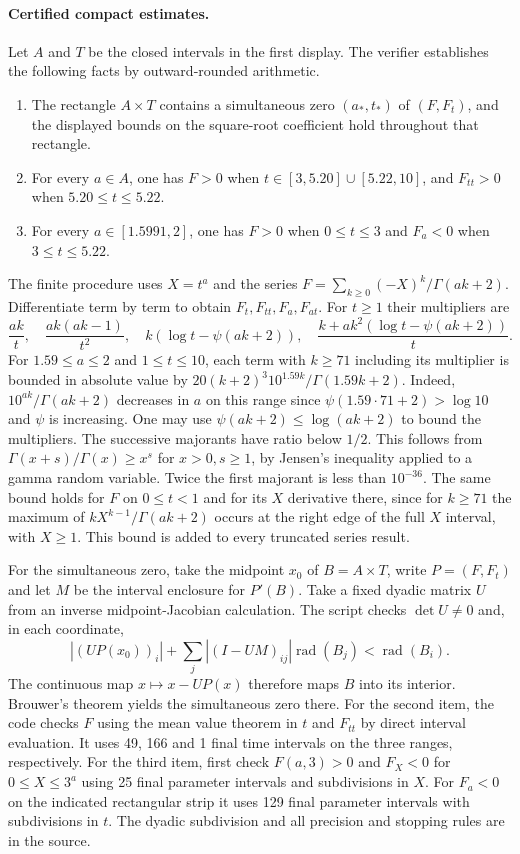 \documentclass[11pt,a4paper]{article}
\numberwithin{equation}{section}
\begin{document}
\paragraph{Certified compact estimates.}
Let $A$ and $T$ be the closed intervals in the first display. The
verifier establishes the following facts by outward-rounded arithmetic.
\begin{enumerate}
\item The rectangle $A\times T$ contains a simultaneous zero
$(a_*,t_*)$ of $(F,F_t)$, and the displayed bounds on the square-root
coefficient hold throughout that rectangle.
\item For every $a\in A$, one has $F>0$ when
$t\in[3,5.20]\cup[5.22,10]$, and $F_{tt}>0$ when $5.20\le t\le5.22$.
\item For every $a\in[1.5991,2]$, one has $F>0$ when $0\le t\le3$
and $F_a<0$ when $3\le t\le5.22$.
\end{enumerate}

The finite procedure uses $X=t^a$ and the series
$F=\sum_{k\ge0}(-X)^k/\Gamma(ak+2)$. Differentiate
term by term to obtain $F_t,F_{tt},F_a,F_{at}$. For $t\ge1$ their multipliers are
\[
 \frac{ak}{t},\quad \frac{ak(ak-1)}{t^2},\quad k(\log t-\psi(ak+2)),
 \quad \frac{k+ak^2(\log t-\psi(ak+2))}{t}.
\]
For $1.59\le a\le2$ and $1\le t\le10$, each term with $k\ge71$
including its multiplier is bounded in absolute value by
$20(k+2)^3 10^{1.59k}/\Gamma(1.59k+2)$. Indeed,
$10^{ak}/\Gamma(ak+2)$ decreases in $a$ on this range since
$\psi(1.59\cdot71+2)>\log10$ and $\psi$ is increasing.
One may use $\psi(ak+2)\le\log(ak+2)$ to bound the multipliers.
The successive majorants have ratio below $1/2$. This follows from
$\Gamma(x+s)/\Gamma(x)\ge x^s$ for $x>0,s\ge1$, by Jensen's inequality
applied to a gamma random variable. Twice the first majorant is
less than $10^{-36}$. The same bound holds for $F$ on $0\le t<1$
and for its $X$ derivative there, since for $k\ge71$ the maximum
of $k X^{k-1}/\Gamma(ak+2)$ occurs at the right edge of the full
$X$ interval, with $X\ge1$. This bound is added to every truncated
series result.

For the simultaneous zero, take the midpoint $x_0$ of $B=A\times T$,
write $P=(F,F_t)$ and let $M$ be the interval enclosure for $P'(B)$.
Take a fixed dyadic matrix $U$ from an inverse midpoint-Jacobian
calculation. The script checks $\det U\ne0$ and, in each coordinate,
\[
 |(UP(x_0))_i|+\sum_j|(I-UM)_{ij}|\operatorname{rad}(B_j)
                 <\operatorname{rad}(B_i).
\]
The continuous map $x\mapsto x-UP(x)$ therefore maps $B$ into its
interior. Brouwer's theorem yields the simultaneous zero there.
For the second item, the code checks $F$ using the mean value theorem
in $t$ and $F_{tt}$ by direct interval evaluation. It uses 49, 166
and 1 final time intervals on the three ranges, respectively.
For the third item, first check $F(a,3)>0$ and $F_X<0$ for
$0\le X\le3^a$ using 25 final parameter intervals and subdivisions
in $X$. For $F_a<0$ on the indicated rectangular strip it uses 129
final parameter intervals with subdivisions in $t$. The dyadic
subdivision and all precision and stopping rules are in the source.
\end{document}

